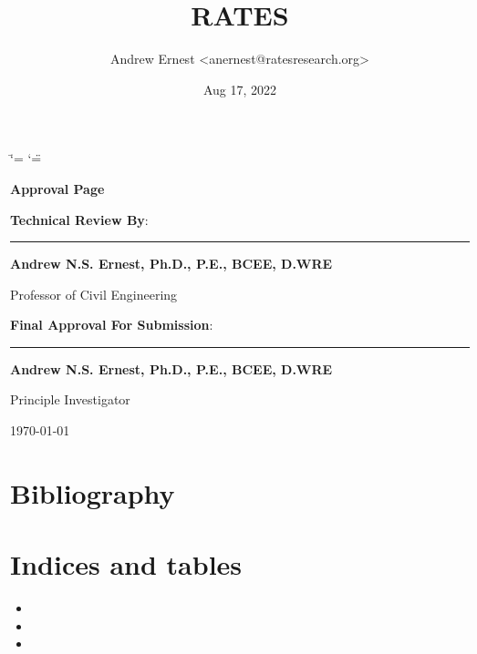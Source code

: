 \documentclass[letterpaper,12pt,english,openany,oneside]{sphinxmanual}
\title{RATES}
\date{Aug 17, 2022}
\author{Andrew Ernest <anernest@ratesresearch.org>}
\begin{document}
\ifdefined\shorthandoff
  \ifnum\catcode`\=\string=\active\shorthandoff{=}\fi
  \ifnum\catcode`\"=\active{}\fi
\fi

\pagestyle{empty}
 
\sphinxmaketitle
    \newcommand\signature[3]{%
    {\sffamily
    \vspace{1cm}\par
    \textbf{#1}:\par
        \begin{minipage}{10cm}
        \centering
        \vspace{3cm}\par
        \rule{10cm}{1pt}\par
        \textbf{#2}\par
        #3%
        \end{minipage}
    }
    }
    \newcommand\insertdate[1][\today]{\vfill\begin{flushright}#1\end{flushright}}
    {\LARGE\sffamily \textbf{Approval Page}}
    
    \signature{Technical Review By}{Andrew N.S. Ernest, Ph.D., P.E., BCEE, D.WRE}{Professor of Civil Engineering}
    
    \signature{Final Approval For Submission}{Andrew N.S. Ernest, Ph.D., P.E., BCEE, D.WRE}{Principle Investigator}
        
    \insertdate

\pagestyle{plain}
\sphinxtableofcontents
\pagestyle{normal}
\label{\detokenize{index::doc}}


\sphinxstepscope


\chapter{Bibliography}
\label{\detokenize{bibliography:bibliography}}\label{\detokenize{bibliography::doc}}
\sphinxAtStartPar


\sphinxAtStartPar



\chapter{Indices and tables}
\label{\detokenize{index:indices-and-tables}}\begin{itemize}
\item {} 
\sphinxAtStartPar
{}

\item {} 
\sphinxAtStartPar
{}

\item {} 
\sphinxAtStartPar
{}

\end{itemize}
\end{document}
